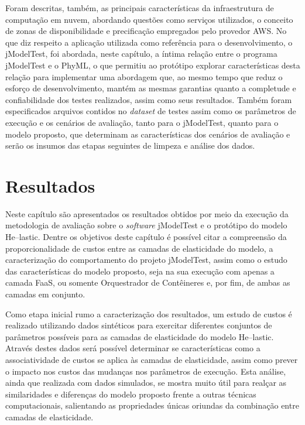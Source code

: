 \documentclass[english,brazilian]{UNISINOSmonografia} %
\begin{document}
Foram descritas, também, as principais características da infraestrutura de computação em nuvem, abordando questões como serviços utilizados, o conceito de zonas de disponibilidade e precificação empregados pelo provedor AWS.
%
No que diz respeito a aplicação utilizada como referência para o desenvolvimento, o jModelTest, foi abordada, neste capítulo, a íntima relação entre o programa jModelTest e o PhyML, o que permitiu ao protótipo explorar características desta relação para implementar uma abordagem que, ao mesmo tempo que reduz o esforço de desenvolvimento, mantém as mesmas garantias quanto a completude e confiabilidade dos testes realizados, assim como seus resultados.
%
Também foram especificados arquivos contidos no \textit{dataset} de testes assim como os parâmetros de execução e os cenários de avaliação, tanto para o jModelTest, quanto para o modelo proposto, que determinam as características dos cenários de avaliação e serão os insumos das etapas seguintes de limpeza e análise dos dados.







\chapter{Resultados}
\label{ch:resultados}




Neste capítulo são apresentados os resultados obtidos por meio da execução da metodologia de avaliação sobre o \textit{software} jModelTest e o protótipo do modelo \textsf{He}--lastic.
%
Dentre os objetivos deste capítulo é possível citar a compreensão da proporcionalidade de custos entre as camadas de elasticidade do modelo, a caracterização do comportamento do projeto jModelTest, assim como o estudo das características do modelo proposto, seja na sua execução com apenas a camada FaaS, ou somente Orquestrador de Contêineres e, por fim, de ambas as camadas em conjunto.



Como etapa inicial rumo a caracterização dos resultados, um estudo de custos é realizado utilizando dados sintéticos para exercitar diferentes conjuntos de parâmetros possíveis para as camadas de elasticidade do modelo \textsf{He}--lastic.
%
Através destes dados será possível determinar se características como a associatividade de custos se aplica às camadas de elasticidade, assim como prever o impacto nos custos das mudanças nos parâmetros de execução.
%
Esta análise, ainda que realizada com dados simulados, se mostra muito útil para realçar as similaridades e diferenças do modelo proposto frente a outras técnicas computacionais, salientando as propriedades únicas oriundas da combinação entre camadas de elasticidade.
\end{document}
